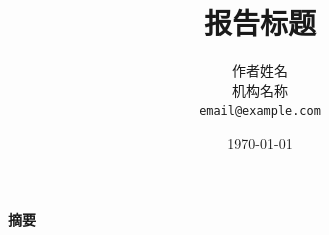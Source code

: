 \documentclass{article}
\title{报告标题}
\author{作者姓名 \\
机构名称 \\
\texttt{email@example.com}}
\date{\today}
\renewenvironment{abstract}{
  \centerline{\large\bfseries 摘要}
  \begin{quote}
}{
  \end{quote}
}
\begin{document}
\maketitle


\begin{abstract}

\end{abstract}











\appendix



% 
% 


\end{document}
